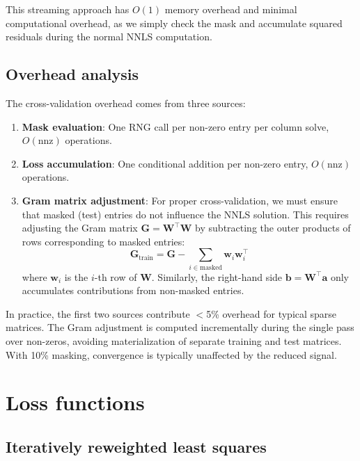 \documentclass[article]{jss_modified}
\begin{document}
This streaming approach has $O(1)$ memory overhead and minimal computational 
overhead, as we simply check the mask and accumulate squared residuals during 
the normal NNLS computation.

\subsection{Overhead analysis}

The cross-validation overhead comes from three sources:
\begin{enumerate}
  \item \textbf{Mask evaluation}: One RNG call per non-zero entry per column 
  solve, $O(\text{nnz})$ operations.
  \item \textbf{Loss accumulation}: One conditional addition per non-zero entry, 
  $O(\text{nnz})$ operations.
  \item \textbf{Gram matrix adjustment}: For proper cross-validation, we must 
  ensure that masked (test) entries do not influence the NNLS solution. This 
  requires adjusting the Gram matrix $\mathbf{G} = \mathbf{W}^\top\mathbf{W}$ by 
  subtracting the outer products of rows corresponding to masked entries:
  \begin{equation}
    \mathbf{G}_{\text{train}} = \mathbf{G} - \sum_{i \in \text{masked}} 
    \mathbf{w}_i \mathbf{w}_i^\top
    \label{eq:gram_adjust}
  \end{equation}
  where $\mathbf{w}_i$ is the $i$-th row of $\mathbf{W}$. Similarly, the 
  right-hand side $\mathbf{b} = \mathbf{W}^\top\mathbf{a}$ only accumulates 
  contributions from non-masked entries.
\end{enumerate}

In practice, the first two sources contribute $<$5\% overhead for typical sparse 
matrices. The Gram adjustment is computed incrementally during the single pass 
over non-zeros, avoiding materialization of separate training and test matrices.
With 10\% masking, convergence is typically unaffected by the reduced signal.


\section{Loss functions} \label{sec:lossfunctions}

\subsection{Iteratively reweighted least squares}
\end{document}
